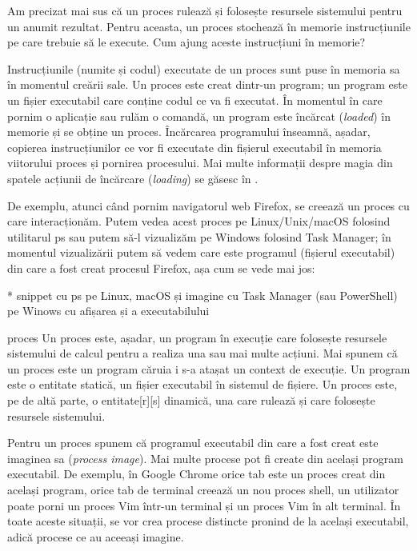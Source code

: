 Am precizat mai sus că un proces rulează și folosește resursele sistemului
pentru un anumit rezultat. Pentru aceasta, un proces stochează în memorie
instrucțiunile pe care trebuie să le execute. Cum ajung aceste instrucțiuni în
memorie?

Instrucțiunile (numite și codul) executate de un proces sunt puse în memoria sa
în momentul creării sale. Un proces este creat dintr-un program; un program este
un fișier executabil care conține codul ce va fi executat. În momentul în care
pornim o aplicație sau rulăm o comandă, un program este încărcat
(\textit{loaded}) în memorie și se obține un proces. Încărcarea programului
înseamnă, așadar, copierea instrucțiunilor ce vor fi executate din fișierul
executabil în memoria viitorului proces și pornirea procesului. Mai multe
informații despre magia din spatele acțiunii de încărcare (\textit{loading}) se
găsesc în .

De exemplu, atunci când pornim navigatorul web Firefox, se creează un proces cu
care interacționăm. Putem vedea acest proces pe Linux/Unix/macOS folosind
utilitarul ps sau putem să-l vizualizăm pe Windows folosind Task Manager; în
momentul vizualizării putem să vedem care este programul (fișierul executabil)
din care a fost creat procesul Firefox, așa cum se vede mai jos:

* snippet cu ps pe Linux, macOS și imagine cu Task Manager (sau PowerShell) pe Winows cu afișarea și a executabilului

\begin{definition}{proces}
	Un proces este, așadar, un program în execuție care folosește resursele
	sistemului de calcul pentru a realiza una sau mai multe acțiuni. Mai
	spunem că un proces este un program căruia i s-a atașat un context de
	execuție. Un program este o entitate statică, un fișier executabil în
	sistemul de fișiere. Un proces este, pe de altă parte, o entitate[r][s]
	dinamică, una care rulează și care folosește resursele sistemului.
\end{definition}

Pentru un proces spunem că programul executabil din care a fost creat este
imaginea sa (\textit{process image}). Mai multe procese pot fi create din
același program executabil. De exemplu, în Google Chrome orice tab este un
proces creat din același program, orice tab de terminal creează un nou proces
shell, un utilizator poate porni un proces Vim într-un terminal și un proces Vim
în alt terminal. În toate aceste situații, se vor crea procese distincte pronind
de la același executabil, adică procese ce au aceeași imagine.

